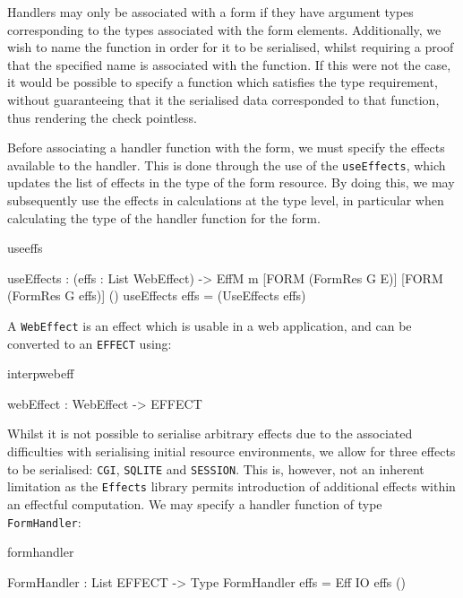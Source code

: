Handlers may only be associated with a form if they have argument types
corresponding to the types associated with the form elements. Additionally, we
wish to name the function in order for it to be serialised, whilst requiring a
proof that the specified name is associated with the function. If this were not
the case, it would be possible to specify a function which satisfies the type
requirement, without guaranteeing that it the serialised data corresponded to
that function, thus rendering the check pointless. 

Before associating a handler function with the form, we must specify the
effects available to the handler. This is done through the use of the
\texttt{useEffects}, which updates the list of effects in the type of the form
resource. By doing this, we may subsequently use the effects in calculations at
the type level, in particular when calculating the type of the handler function
for the form. 

\begin{SaveVerbatim}{useeffs}

useEffects : (effs : List WebEffect) ->
             EffM m [FORM (FormRes G E)] 
                    [FORM (FormRes G effs)] ()
useEffects effs = (UseEffects effs)

\end{SaveVerbatim}

\noindent
A \texttt{WebEffect} is an effect which is usable in a web application, and can
be converted to an \texttt{EFFECT} using:

\begin{SaveVerbatim}{interpwebeff}

webEffect : WebEffect -> EFFECT

\end{SaveVerbatim}

Whilst it is not possible to serialise arbitrary effects due to the associated
difficulties with serialising initial resource environments, we allow for three
effects to be serialised: \texttt{CGI}, \texttt{SQLITE} and \texttt{SESSION}.
This is, however, not an inherent limitation as the \texttt{Effects} library
permits introduction of additional effects within an effectful computation.
%
We may specify a handler function of type \texttt{FormHandler}:

\begin{SaveVerbatim}{formhandler}

FormHandler : List EFFECT -> Type
FormHandler effs = Eff IO effs ()

\end{SaveVerbatim}

